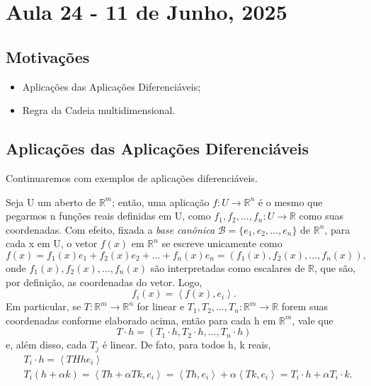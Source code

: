 \documentclass[../analysisII_notes.tex]{subfiles}
\begin{document}
\section{Aula 24 - 11 de Junho, 2025}
\subsection{Motivações}
\begin{itemize}
	\item Aplicações das Aplicações Diferenciáveis;
	\item Regra da Cadeia multidimensional.
\end{itemize}
\subsection{Aplicações das Aplicações Diferenciáveis}
Continuaremos com exemplos de aplicações diferenciáveis.
\begin{example}
	Seja U um aberto de \(\mathbb{R}^{m}\); então, uma aplicação \(f:U\rightarrow \mathbb{R}^{n}\) é o mesmo que pegarmos n funções reais definidas em U, como \(f_1, f_2,\dotsc , f_{n}:U\rightarrow \mathbb{R}\) como suas coordenadas. Com efeito, fixada a \textit{base canônica} \(\mathcal{B}=\{e_1, e_2, \dotsc , e_{n}\}\) de \(\mathbb{R}^{n}\), para cada x em U, o vetor \(f(x)\) em \(\mathbb{R}^{n}\) se escreve unicamente como
	\[
		f(x)=f_1 (x)e_1 + f_2(x)e_2 + \dotsc + f_{n}(x)e_{n} = (f_1(x), f_2(x), \dotsc , f_{n}(x)),
	\]
	onde \(f_1(x), f_2(x), \dotsc , f_{n}(x)\) são interpretadas como escalares de \(\mathbb{R}\), que são, por definição, as coordenadas do vetor. Logo,
	\[
		f_{i}(x)=\left< f(x), e_{i} \right>.
	\]
	Em particular, se \(T:\mathbb{R}^{m}\rightarrow \mathbb{R}^{n}\) for linear e \(T_1, T_2, \dotsc , T_{n}:\mathbb{R}^{m}\rightarrow \mathbb{R}\) forem suas coordenadas conforme elaborado acima, então para cada h em \(\mathbb{R}^{m}\), vale que
	\[
		T \cdot h = (T_1 \cdot h, T_2 \cdot h, \dotsc , T_n \cdot h)
	\]
	e, além disso, cada \(T_{j}\) é linear. De fato, para todos h, k reais,
	\begin{align*}
		 & T_{i} \cdot h = \left< THh e_{i} \right>                                                                                                                     \\
		 & T_{i}(h+\alpha k) = \left< Th + \alpha Tk, e_{i} \right>= \left< Th, e_{i} \right> + \alpha \left< Tk, e_{i} \right> = T_{i} \cdot h + \alpha T_{i} \cdot k.
	\end{align*}
\end{example}
\end{document}
